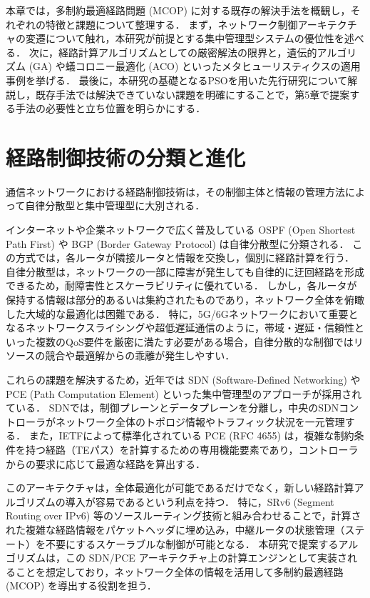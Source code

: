 
本章では，多制約最適経路問題 (MCOP) に対する既存の解決手法を概観し，それぞれの特徴と課題について整理する．
まず，ネットワーク制御アーキテクチャの変遷について触れ，本研究が前提とする集中管理型システムの優位性を述べる．
次に，経路計算アルゴリズムとしての厳密解法の限界と，遺伝的アルゴリズム (GA) や蟻コロニー最適化 (ACO) といったメタヒューリスティクスの適用事例を挙げる．
最後に，本研究の基礎となるPSOを用いた先行研究について解説し，既存手法では解決できていない課題を明確にすることで，第5章で提案する手法の必要性と立ち位置を明らかにする．

\section{経路制御技術の分類と進化}
通信ネットワークにおける経路制御技術は，その制御主体と情報の管理方法によって自律分散型と集中管理型に大別される．

インターネットや企業ネットワークで広く普及している OSPF (Open Shortest Path First) や BGP (Border Gateway Protocol) は自律分散型に分類される．
この方式では，各ルータが隣接ルータと情報を交換し，個別に経路計算を行う．
自律分散型は，ネットワークの一部に障害が発生しても自律的に迂回経路を形成できるため，耐障害性とスケーラビリティに優れている．
しかし，各ルータが保持する情報は部分的あるいは集約されたものであり，ネットワーク全体を俯瞰した大域的な最適化は困難である．
特に，5G/6Gネットワークにおいて重要となるネットワークスライシングや超低遅延通信のように，帯域・遅延・信頼性といった複数のQoS要件を厳密に満たす必要がある場合，自律分散的な制御ではリソースの競合や最適解からの乖離が発生しやすい\cite{Akyildiz2015}．

これらの課題を解決するため，近年では SDN (Software-Defined Networking) や PCE (Path Computation Element) といった集中管理型のアプローチが採用されている．
SDNでは，制御プレーンとデータプレーンを分離し，中央のSDNコントローラがネットワーク全体のトポロジ情報やトラフィック状況を一元管理する．
また，IETFによって標準化されている PCE (RFC 4655) は，複雑な制約条件を持つ経路（TEパス）を計算するための専用機能要素であり，コントローラからの要求に応じて最適な経路を算出する\cite{RFC4655}．

このアーキテクチャは，全体最適化が可能であるだけでなく，新しい経路計算アルゴリズムの導入が容易であるという利点を持つ．
特に，SRv6 (Segment Routing over IPv6) 等のソースルーティング技術と組み合わせることで，計算された複雑な経路情報をパケットヘッダに埋め込み，中継ルータの状態管理（ステート）を不要にするスケーラブルな制御が可能となる\cite{RFC8402}．
本研究で提案するアルゴリズムは，この SDN/PCE アーキテクチャ上の計算エンジンとして実装されることを想定しており，ネットワーク全体の情報を活用して多制約最適経路 (MCOP) を導出する役割を担う．

